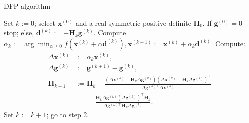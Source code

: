 \begin{algorithm}
\caption{DFP algorithm} \label{alg:DFP}
\begin{spacing}{1.5}
	\begin{algorithmic}[1]
		\State Set \( k := 0 \); select \( \boldsymbol{x}^{(0)} \) and a real symmetric positive definite \( \boldsymbol{H}_0 \).
		\State If {\( \boldsymbol{g}^{(0)} = 0 \)} stop; else, \( \boldsymbol{d}^{(k)} := -\boldsymbol{H}_k \boldsymbol{g}^{(k)} \).
		\State Compute \( \alpha_k := \arg \min_{\alpha \geq 0} f(\boldsymbol{x}^{(k)} + \alpha \boldsymbol{d}^{(k)}), \boldsymbol{x}^{(k+1)} := \boldsymbol{x}^{(k)} + \alpha_k \boldsymbol{d}^{(k)} \).
		\State Compute:
		\begin{align*}
			\Delta \boldsymbol{x}^{(k)} &:= \alpha_k \boldsymbol{x}^{(k)}, \\
			\Delta \boldsymbol{g}^{(k)} &:= \boldsymbol{g}^{(k+1)} - \boldsymbol{g}^{(k)}, \\
			\boldsymbol{H}_{k+1} &:= \boldsymbol{H}_k + \frac{(\Delta \boldsymbol{x}^{(k)} - \boldsymbol{H}_k \Delta \boldsymbol{g}^{(k)}) (\Delta \boldsymbol{x}^{(k)} - \boldsymbol{H}_k \Delta \boldsymbol{g}^{(k)})^{\top}}{\Delta \boldsymbol{g}^{(k)\top} \Delta \boldsymbol{x}^{(k)}} \\
			&\phantom{:=} - \frac{\boldsymbol{H}_k \Delta \boldsymbol{g}^{(k)} (\Delta \boldsymbol{g}^{(k)})^{\top} \boldsymbol{H}_k}{\Delta \boldsymbol{g}^{(k)\top} \boldsymbol{H}_k \Delta \boldsymbol{g}^{(k)}}.
		\end{align*}
		\State Set \( k := k + 1 \); go to step 2.
	\end{algorithmic}
\end{spacing}
\end{algorithm}

